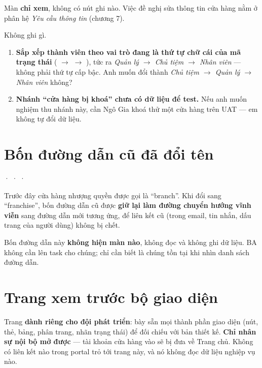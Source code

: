 \mkiem{---}

Màn \textbf{chỉ xem}, không có nút ghi nào. Việc đề nghị sửa thông tin cửa hàng nằm ở phân hệ
\emph{Yêu cầu thông tin} (chương 7).

\mghi

Không ghi gì.

\mhoi

\begin{ask}
\begin{enumerate}[leftmargin=*]
  \item \textbf{Sắp xếp thành viên theo vai trò đang là thứ tự chữ cái của mã trạng thái}
        ( $\rightarrow$  $\rightarrow$ ), tức ra \emph{Quản lý
        $\rightarrow$ Chủ tiệm $\rightarrow$ Nhân viên} --- không phải thứ tự cấp bậc. Anh muốn
        đổi thành \emph{Chủ tiệm $\rightarrow$ Quản lý $\rightarrow$ Nhân viên} không?
  \item \textbf{Nhánh ``cửa hàng bị khoá'' chưa có dữ liệu để test.} Nếu anh muốn nghiệm thu
        nhánh này, cần Ngô Gia khoá thử một cửa hàng trên UAT --- em không tự đổi dữ liệu.
\end{enumerate}
\end{ask}

\section{Bốn đường dẫn cũ đã đổi tên}
 ·  ·  ·
\medskip

Trước đây cửa hàng nhượng quyền được gọi là ``branch''. Khi đổi sang ``franchise'', bốn đường
dẫn cũ được \textbf{giữ lại làm đường chuyển hướng vĩnh viễn} sang đường dẫn mới tương ứng, để
liên kết cũ (trong email, tin nhắn, dấu trang của người dùng) không bị chết.

Bốn đường dẫn này \textbf{không hiện màn nào}, không đọc và không ghi dữ liệu. BA không cần lên
task cho chúng; chỉ cần biết là chúng tồn tại khi nhìn danh sách đường dẫn.

\section{Trang xem trước bộ giao diện}
\medskip

Trang \textbf{dành riêng cho đội phát triển}: bày sẵn mọi thành phần giao diện (nút, thẻ, bảng,
phân trang, nhãn trạng thái) để đối chiếu với bản thiết kế. \textbf{Chỉ nhân sự nội bộ mở
được} --- tài khoản cửa hàng vào sẽ bị đưa về Trang chủ. Không có liên kết nào trong portal trỏ
tới trang này, và nó không đọc dữ liệu nghiệp vụ nào.

